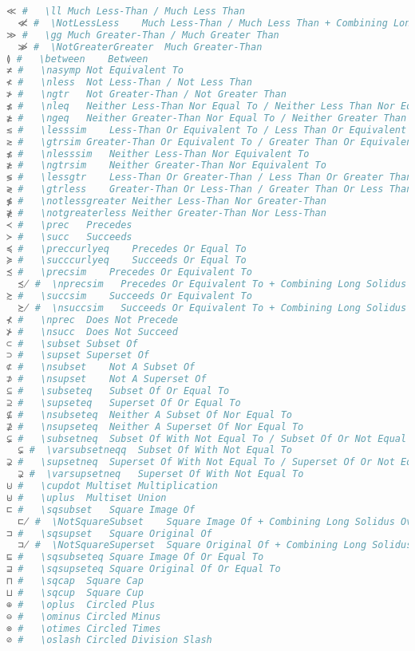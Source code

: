 \begin{lstlisting}[language=Julia, style=julia, linewidth=\textwidth]
≪ #   \ll Much Less-Than / Much Less Than
  ≪̸ #  \NotLessLess    Much Less-Than / Much Less Than + Combining Long Solidus Overlay
≫ #   \gg Much Greater-Than / Much Greater Than
  ≫̸ #  \NotGreaterGreater  Much Greater-Than
≬ #   \between    Between
≭ #   \nasymp Not Equivalent To
≮ #   \nless  Not Less-Than / Not Less Than
≯ #   \ngtr   Not Greater-Than / Not Greater Than
≰ #   \nleq   Neither Less-Than Nor Equal To / Neither Less Than Nor Equal To
≱ #   \ngeq   Neither Greater-Than Nor Equal To / Neither Greater Than Nor Equal To
≲ #   \lesssim    Less-Than Or Equivalent To / Less Than Or Equivalent To
≳ #   \gtrsim Greater-Than Or Equivalent To / Greater Than Or Equivalent To
≴ #   \nlesssim   Neither Less-Than Nor Equivalent To
≵ #   \ngtrsim    Neither Greater-Than Nor Equivalent To
≶ #   \lessgtr    Less-Than Or Greater-Than / Less Than Or Greater Than
≷ #   \gtrless    Greater-Than Or Less-Than / Greater Than Or Less Than
≸ #   \notlessgreater Neither Less-Than Nor Greater-Than
≹ #   \notgreaterless Neither Greater-Than Nor Less-Than
≺ #   \prec   Precedes
≻ #   \succ   Succeeds
≼ #   \preccurlyeq    Precedes Or Equal To
≽ #   \succcurlyeq    Succeeds Or Equal To
≾ #   \precsim    Precedes Or Equivalent To
  ≾̸ #  \nprecsim   Precedes Or Equivalent To + Combining Long Solidus Overlay
≿ #   \succsim    Succeeds Or Equivalent To
  ≿̸ #  \nsuccsim   Succeeds Or Equivalent To + Combining Long Solidus Overlay
⊀ #   \nprec  Does Not Precede
⊁ #   \nsucc  Does Not Succeed
⊂ #   \subset Subset Of
⊃ #   \supset Superset Of
⊄ #   \nsubset    Not A Subset Of
⊅ #   \nsupset    Not A Superset Of
⊆ #   \subseteq   Subset Of Or Equal To
⊇ #   \supseteq   Superset Of Or Equal To
⊈ #   \nsubseteq  Neither A Subset Of Nor Equal To
⊉ #   \nsupseteq  Neither A Superset Of Nor Equal To
⊊ #   \subsetneq  Subset Of With Not Equal To / Subset Of Or Not Equal To
  ⊊︀ #  \varsubsetneqq  Subset Of With Not Equal To
⊋ #   \supsetneq  Superset Of With Not Equal To / Superset Of Or Not Equal To
  ⊋︀ #  \varsupsetneq   Superset Of With Not Equal To
⊍ #   \cupdot Multiset Multiplication
⊎ #   \uplus  Multiset Union
⊏ #   \sqsubset   Square Image Of
  ⊏̸ #  \NotSquareSubset    Square Image Of + Combining Long Solidus Overlay
⊐ #   \sqsupset   Square Original Of
  ⊐̸ #  \NotSquareSuperset  Square Original Of + Combining Long Solidus Overlay
⊑ #   \sqsubseteq Square Image Of Or Equal To
⊒ #   \sqsupseteq Square Original Of Or Equal To
⊓ #   \sqcap  Square Cap
⊔ #   \sqcup  Square Cup
⊕ #   \oplus  Circled Plus
⊖ #   \ominus Circled Minus
⊗ #   \otimes Circled Times
⊘ #   \oslash Circled Division Slash

\end{lstlisting}
